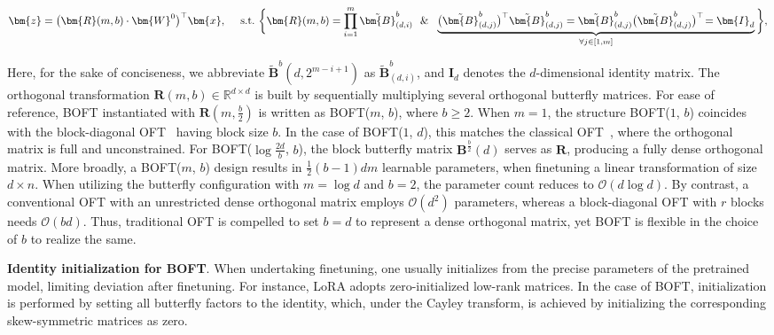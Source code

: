 \begin{equation}
    \begin{aligned}\nonumber
    \bm{z}=\big(\bm{R}(m,b)\cdot\bm{W}^0\big)^\top\bm{x},~~~~\text{s.t.}~\bigg{\{}\bm{R}(m,b)=\prod_{i=1}^m \tilde{\bm{B}}^b_{(d,i)}~~\&~~\underbrace{\big(\tilde{\bm{B}}^b_{(d,j)}\big)^\top\tilde{\bm{B}}^b_{(d,j)}=\tilde{\bm{B}}^b_{(d,j)}\big(\tilde{\bm{B}}^b_{(d,j)}\big)^\top\!=\bm{I}_d}_{\forall j\in [1, m]}\bigg{\}},
    \end{aligned}
\end{equation}

Here, for the sake of conciseness, we abbreviate $\tilde{\bm{B}}^b(d,2^{m-i+1})$ as $\tilde{\bm{B}}^b_{(d,i)}$, and $\bm{I}_d$ denotes the $d$-dimensional identity matrix. The orthogonal transformation $\bm{R}(m,b)\in\mathbb{R}^{d\times d}$ is built by sequentially multiplying several orthogonal butterfly matrices. For ease of reference, BOFT instantiated with $\bm{R}(m, \frac{b}{2})$ is written as BOFT($m$, $b$), where $b\geq 2$. When $m=1$, the structure BOFT($1$, $b$) coincides with the block-diagonal OFT~\cite{qiu2023controlling} having block size $b$. In the case of BOFT($1$, $d$), this matches the classical OFT~\cite{qiu2023controlling}, where the orthogonal matrix is full and unconstrained. For BOFT($\log \frac{2d}{b}$, $b$), the block butterfly matrix $\bm{B}^{\frac{b}{2}}(d)$ serves as $\bm{R}$, producing a fully dense orthogonal matrix. More broadly, a BOFT($m$, $b$) design results in $\frac{1}{2}(b-1)dm$ learnable parameters, when finetuning a linear transformation of size $d\times n$. When utilizing the butterfly configuration with $m=\log d$ and $b=2$, the parameter count reduces to $\mathcal{O}(d\log d)$. By contrast, a conventional OFT with an unrestricted dense orthogonal matrix employs $\mathcal{O}(d^2)$ parameters, whereas a block-diagonal OFT with $r$ blocks needs $\mathcal{O}(bd)$. Thus, traditional OFT is compelled to set $b=d$ to represent a dense orthogonal matrix, yet BOFT is flexible in the choice of $b$ to realize the same.

\textbf{Identity initialization for BOFT}. When undertaking finetuning, one usually initializes from the precise parameters of the pretrained model, limiting deviation after finetuning. For instance, LoRA adopts zero-initialized low-rank matrices. In the case of BOFT, initialization is performed by setting all butterfly factors to the identity, which, under the Cayley transform, is achieved by initializing the corresponding skew-symmetric matrices as zero.

